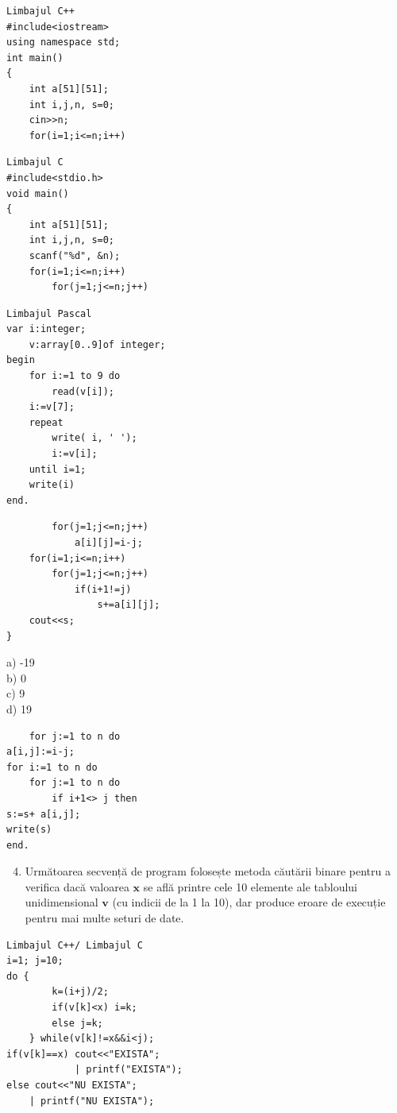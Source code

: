\documentclass[10pt]{article}
\begin{document}
\begin{verbatim}
Limbajul C++
#include<iostream>
using namespace std;
int main()
{
    int a[51][51];
    int i,j,n, s=0;
    cin>>n;
    for(i=1;i<=n;i++)
\end{verbatim}

\begin{verbatim}
Limbajul C
#include<stdio.h>
void main()
{
    int a[51][51];
    int i,j,n, s=0;
    scanf("%d", &n);
    for(i=1;i<=n;i++)
        for(j=1;j<=n;j++)
\end{verbatim}

\begin{verbatim}
Limbajul Pascal
var i:integer;
    v:array[0..9]of integer;
begin
    for i:=1 to 9 do
        read(v[i]);
    i:=v[7];
    repeat
        write( i, ' ');
        i:=v[i];
    until i=1;
    write(i)
end.
\end{verbatim}

\begin{verbatim}
        for(j=1;j<=n;j++)
            a[i][j]=i-j;
    for(i=1;i<=n;i++)
        for(j=1;j<=n;j++)
            if(i+1!=j)
                s+=a[i][j];
    cout<<s;
}
\end{verbatim}

a) -19\\
b) 0\\
c) 9\\
d) 19

\begin{verbatim}
    for j:=1 to n do
a[i,j]:=i-j;
for i:=1 to n do
    for j:=1 to n do
        if i+1<> j then
s:=s+ a[i,j];
write(s)
end.
\end{verbatim}

\begin{enumerate}
  \setcounter{enumi}{3}
  \item Următoarea secvență de program folosește metoda căutării binare pentru a verifica dacă valoarea $\mathbf{x}$ se află printre cele 10 elemente ale tabloului unidimensional $\mathbf{v}$ (cu indicii de la 1 la 10), dar produce eroare de execuție pentru mai multe seturi de date.
\end{enumerate}

\begin{verbatim}
Limbajul C++/ Limbajul C
i=1; j=10;
do {
        k=(i+j)/2;
        if(v[k]<x) i=k;
        else j=k;
    } while(v[k]!=x&&i<j);
if(v[k]==x) cout<<"EXISTA";
            | printf("EXISTA");
else cout<<"NU EXISTA";
    | printf("NU EXISTA");
\end{verbatim}
\end{document}
